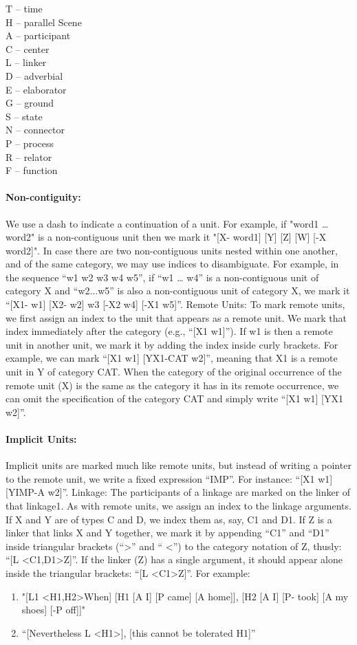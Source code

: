 \documentclass[11pt]{article}
\newcommand{\be}{\begin{enumerate}}
\newcommand{\ee}{\end{enumerate}}
\begin{document}
\noindent
T -- time \\
H -- parallel Scene \\
A -- participant \\
C -- center \\
L -- linker\\
D -- adverbial\\
E -- elaborator\\
G -- ground\\
S -- state\\
N -- connector\\
P -- process\\
R -- relator\\
F -- function\\


\paragraph{Non-contiguity:} We use a dash to indicate a continuation of a unit. For example, if "word1 … word2" is a non-contiguous unit then we mark it "[X- word1] [Y] [Z] [W] [-X word2]".
In case there are two non-contiguous units nested within one another, and of the same category, we may use indices to disambiguate. For example, in the sequence ``w1 w2 w3 w4 w5'', if ``w1 … w4'' is a non-contiguous unit of category X and ``w2...w5'' is also a non-contiguous unit of category X, we mark it ``[X1- w1] [X2- w2] w3 [-X2 w4] [-X1 w5]''.
Remote Units: To mark remote units, we first assign an index to the unit that appears as a remote unit. We mark that index immediately after the category (e.g., ``[X1 w1]''). If w1 is then a remote unit in another unit, we mark it by adding the index inside curly brackets. For example, we can mark ``[X1 w1] [Y{X1-CAT} w2]'', meaning that X1 is a remote unit in Y of category CAT. When the category of the original occurrence of the remote unit (X) is the same as the category it has in its remote occurrence, we can omit the specification of the category CAT and simply write ``[X1 w1] [Y{X1} w2]''.

\paragraph{Implicit Units:}
Implicit units are marked much like remote units, but instead of writing a pointer to the remote unit, we write a fixed expression ``IMP''. For instance: ``[X1 w1] [Y{IMP-A} w2]''.
Linkage: The participants of a linkage are marked on the linker of that linkage1. As with remote units, we assign an index to the linkage arguments. If X and Y are of types C and D, we index them as, say, C1 and D1. If Z is a linker that links X and Y together, we mark it by appending ``C1'' and ``D1'' inside triangular brackets (``\textgreater'' and `` \textless '') to the category notation of Z, thusly: ``[L \textless C1,D1\textgreater Z]''. If the linker (Z) has a single argument, it should appear alone inside the triangular brackets: ``[L \textless C1\textgreater Z]''. For example:

\be
\item
"[L1 \textless H1,H2\textgreater When] [H1 [A I] [P came] [A home]], [H2 [A I] [P- took] [A my shoes] [-P off]]"
\item
``[Nevertheless L \textless H1\textgreater], [this cannot be tolerated H1]''
\ee
\end{document}
